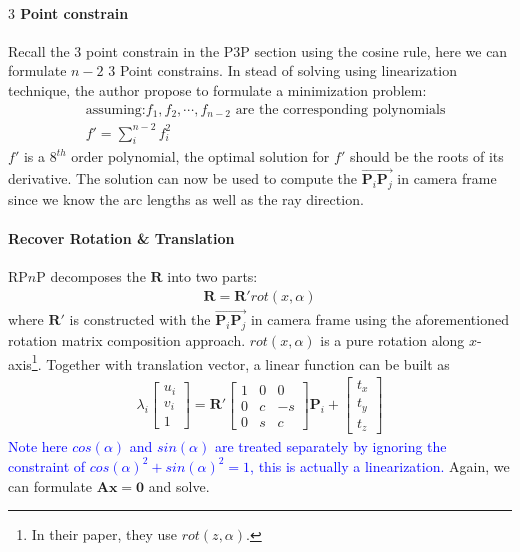 \documentclass[a4paper]{report}
\begin{document}
\paragraph{$3$ Point constrain}
Recall the $3$ point constrain in the P$3$P section using the cosine rule, here we can formulate $n-2$ $3$ Point constrains. In stead of solving using linearization technique, the author propose to formulate a minimization problem:
\begin{align*}
&\text{assuming:$f_1,f_2,\cdots,f_{n-2}$ are the corresponding polynomials} \\
& f' = \sum_{i}^{n-2} f_i^2
\end{align*}
$f'$ is a $8^{th}$ order polynomial, the optimal solution for $f'$ should be the roots of its derivative. The solution can now be used to compute the $\overrightarrow{\mathbf{P}_i\mathbf{P}_j}$ in camera frame since we know the arc lengths as well as the ray direction.
\paragraph{Recover Rotation \& Translation}
RP$n$P decomposes the $\mathbf{R}$ into two parts:
\begin{align*}
\mathbf{R}=\mathbf{R}'rot(x,\alpha)
\end{align*}
where $\mathbf{R}'$ is constructed with the $\overrightarrow{\mathbf{P}_i\mathbf{P}_j}$ in camera frame using the aforementioned rotation matrix composition approach. $rot(x,\alpha)$ is a pure rotation along $x$-axis\footnote{In their paper, they use $rot(z,\alpha)$.}. Together with translation vector, a linear function can be built as
\begin{align*}
\lambda_i \left[ 
\begin{matrix}
u_i \\ v_i \\ 1
\end{matrix}
\right]=\mathbf{R}'\left[ 
\begin{matrix}
1 & 0 & 0 \\ 0 & c & -s \\ 0 & s & c
\end{matrix}
\right]\mathbf{P}_i+\left[ 
\begin{matrix}
t_x \\ t_y \\ t_z
\end{matrix}
\right]
\end{align*}
\textcolor{blue}{Note here $cos(\alpha)$ and $sin(\alpha)$ are treated separately by ignoring the constraint of $cos(\alpha)^2+sin(\alpha)^2=1$, this is actually a linearization.} Again, we can formulate $\mathbf{Ax}=\mathbf{0}$ and solve. 
\end{document}
